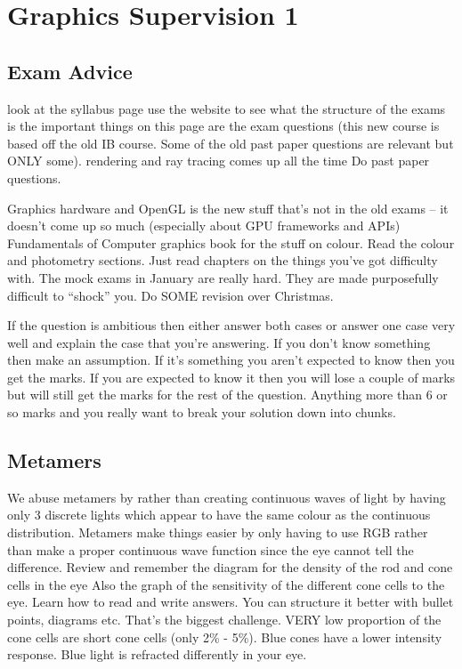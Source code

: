 \documentclass[10pt, a4paper]{article}
\begin{document}
\section*{Graphics Supervision 1}

\subsection*{Exam Advice}

look at the syllabus page
use the website to see what the structure of the exams is
the important things on this page are the exam questions
(this new course is based off the old IB course. Some of the old past paper questions are relevant but ONLY some).
rendering and ray tracing comes up all the time
Do past paper questions.

Graphics hardware and OpenGL is the new stuff that's not in the old exams --
it doesn't come up so much (especially about GPU frameworks and APIs)
Fundamentals of Computer graphics book for the stuff on colour.
Read the colour and photometry sections.
Just read chapters on the things you've got difficulty with.
The mock exams in January are really hard. They are made purposefully difficult to
``shock'' you. Do SOME revision over Christmas.

If the question is ambitious then either answer both cases or answer one case very well
and explain the case that you're answering. If you don't know something then make an
assumption. If it's something you aren't expected to know then you get the marks.
If you are expected to know it then you will lose a couple of marks but will still get
the marks for the rest of the question. Anything more than 6 or so marks and you really
want to break your solution down into chunks.

\subsection*{Metamers}

We abuse metamers by rather than creating continuous waves of light by having only
3 discrete lights which appear to have the same colour as the continuous distribution.
Metamers make things easier by only having to use RGB rather than make a proper
continuous wave function since the eye cannot tell the difference.
Review and remember the diagram for the density of the rod and cone cells in the eye
Also the graph of the sensitivity of the different cone cells to the eye.
Learn how to read and write answers. You can structure it better with bullet
points, diagrams etc. That's the biggest challenge.
VERY low proportion of the cone cells are short cone cells (only 2\% - 5\%).
Blue cones have a lower intensity response. Blue light is refracted differently in your eye.
\end{document}
